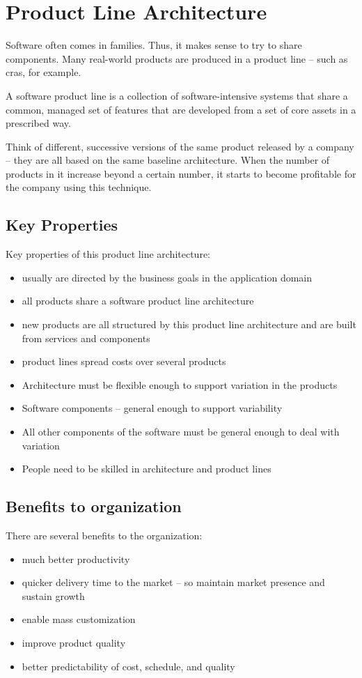 \documentclass[a4paper]{article}
\begin{document}
\newpage
\section{Product Line Architecture}
Software often comes in families. Thus, it makes sense to try to share components. Many real-world products are produced in a product line – such as cras, for example.

A software product line is a collection of software-intensive systems that share a common, managed set of features that are developed from a set of core assets in a prescribed way. 

Think of different, successive versions of the same product released by a company – they are all based on the same baseline architecture. When the number of products in it increase beyond a certain number, it starts to become profitable for the company using this technique.

\subsection{Key Properties}
Key properties of this product line architecture:
\begin{itemize}
\item usually are directed by the business goals in the application domain
\item all products share a software product line architecture
\item new products are all structured by this product line architecture and are built from services and components
\item product lines spread costs over several products
\item Architecture must be flexible enough to support variation in the products
\item Software components – general enough to support variability
\item All other components of the software must be general enough to deal with variation
\item People need to be skilled in architecture and product lines
\end{itemize}

\subsection{Benefits to organization}
There are several benefits to the organization:
\begin{itemize}
\item much better productivity
\item quicker delivery time to the market – so maintain market presence and sustain growth
\item enable mass customization
\item improve product quality
\item better predictability of cost, schedule, and quality
\end{itemize}
\end{document}
